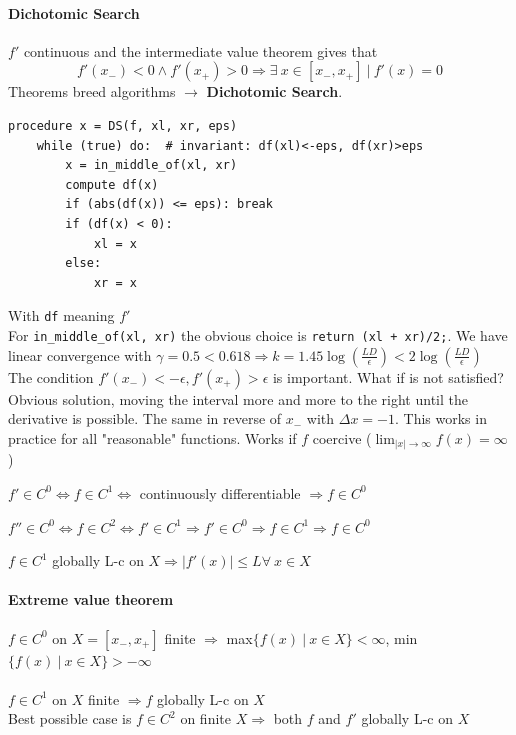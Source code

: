 \documentclass[10pt]{report}
\begin{document}
\paragraph{Dichotomic Search} $f'$ continuous and the intermediate value theorem gives that $$f'(x_-) < 0 \wedge f'(x_+) > 0 \Rightarrow \exists\:x\in[x_-, x_+]\:|\: f'(x) = 0$$
Theorems breed algorithms $\rightarrow$ \textbf{Dichotomic Search}.
\begin{lstlisting}[style=myPython]
procedure x = DS(f, xl, xr, eps)
	while (true) do:  # invariant: df(xl)<-eps, df(xr)>eps
		x = in_middle_of(xl, xr)
		compute df(x)
		if (abs(df(x)) <= eps): break
		if (df(x) < 0):
			xl = x
		else:
			xr = x
\end{lstlisting}
With \texttt{df} meaning $f'$\\
For \texttt{in\_middle\_of(xl, xr)} the obvious choice is \texttt{return (xl + xr)/2;}. We have linear convergence with $\gamma = 0.5 < 0.618 \Rightarrow k = 1.45\log(\frac{LD}{\epsilon}) < 2 \log(\frac{LD}{\epsilon})$\\
The condition $f'(x_-) < -\epsilon, f'(x_+) > \epsilon$ is important. What if is not satisfied? Obvious solution, moving the interval more and more to the right until the derivative is possible. %
The same in reverse of $x_-$ with $\Delta x = -1$. This works in practice for all "reasonable" functions. Works if $f$ coercive ($\lim_{|x| \to \infty} f(x) = \infty$)\\
\begin{list}{}{}
	\item $f' \in C^0 \Leftrightarrow f \in C^1 \Leftrightarrow$ continuously differentiable $\Rightarrow f\in C^0$
	\item $f'' \in C^0 \Leftrightarrow f\in C^2 \Leftrightarrow f' \in C^1 \Rightarrow f' \in C^0 \Rightarrow f \in C^1 \Rightarrow f \in C^0$
	\item $f \in C^1$ globally L-c on $X \Rightarrow |f'(x)| \leq L \forall\: x \in X$
\end{list}
\paragraph{Extreme value theorem} $f \in C^0$ on $X = [x_-, x_+]$ finite $\Rightarrow$ max$\{f(x)\:|\: x\in X\} < \infty$, min$\{f(x)\:|\: x\in X\} > -\infty$\\\\
$f\in C^1$ on $X$ finite $\Rightarrow f$ globally L-c on $X$\\
Best possible case is $f\in C^2$ on finite $X\Rightarrow$ both $f$ and $f'$ globally L-c on $X$
\end{document}
